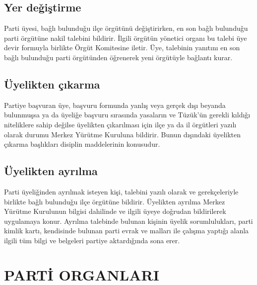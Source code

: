 \documentclass[11pt]{article} %
\begin{document}
\subsection{Yer deǧiştirme}
Parti üyesi, baǧlı bulunduǧu ilçe örgütünü deǧiştirirken, en son baǧlı bulunduǧu parti örgütüne nakil talebini bildirir. İlgili örgütün yönetici organı bu talebi üye devir formuyla birlikte Örgüt Komitesine iletir. Üye, talebinin yanıtını en son baǧlı bulunduǧu parti örgütünden öǧrenerek yeni örgütüyle baǧlantı kurar.
\subsection{Üyelikten çıkarma}
Partiye başvuran üye, başvuru formunda yanlış veya gerçek dışı beyanda bulunmuşsa ya da üyeliǧe başvuru sırasında yasaların ve Tüzük’ün gerekli kıldıǧı niteliklere sahip deǧilse üyelikten çıkarılması için ilçe ya da il örgütleri yazılı olarak durumu Merkez Yürütme Kuruluna bildirir. Bunun dışındaki üyelikten çıkarma başlıkları disiplin maddelerinin konusudur.

\subsection{Üyelikten ayrılma}
Parti üyeliǧinden ayrılmak isteyen kişi, talebini yazılı olarak ve gerekçeleriyle birlikte baǧlı bulunduǧu ilçe örgütüne bildirir. Üyelikten ayrılma Merkez Yürütme Kurulunun bilgisi dahilinde ve ilgili üyeye doǧrudan bildirilerek uygulamaya konur. Ayrılma talebinde bulunan kişinin üyelik sorumlulukları, parti kimlik kartı, kendisinde bulunan parti evrak ve malları ile çalışma yaptıǧı alanla ilgili tüm bilgi ve belgeleri partiye aktardıǧında sona erer.

\section{ PARTİ ORGANLARI}
\end{document}
